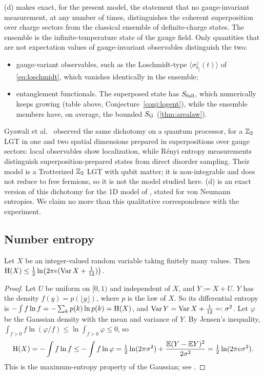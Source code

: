 \begin{remark}\label{rem:superposition-main}
(d) makes exact, for the present model, the statement that no gauge-invariant measurement,
at any number of times, distinguishes the coherent superposition over charge sectors from the classical
ensemble of definite-charge states.  The ensemble is the infinite-temperature state of the gauge field.  Only
quantities that are not expectation values of gauge-invariant observables distinguish the two:
\begin{itemize}
\item gauge-variant observables, such as the Loschmidt-type $\langle\sigma^z_{b_j}(t)\rangle$ of
\eqref{eq:loschmidt}, which vanishes identically in the ensemble;
\item entanglement functionals.  The superposed state has $S_{\mathrm{full}}$, which numerically keeps growing (table
above, Conjecture~\ref{conj:logent}), while the ensemble members have, on average, the bounded $S_{\mathrm{G}}$ (\cref{thm:arealaw}).
\end{itemize}
Gyawali et al.\ \cite{Gyawali2024} observed the same dichotomy on a quantum processor, for a $\mathbb{Z}_2$ LGT in one
and two spatial dimensions prepared in superpositions over gauge sectors: local observables show localization,
while R\'enyi entropy measurements distinguish superposition-prepared states from direct disorder sampling.
Their model is a Trotterized $\mathbb{Z}_2$ LGT with qubit matter; it is non-integrable and does not reduce to free
fermions, so it is not the model studied here.
(d) is an exact version of this dichotomy for the 1D model of \cite{SKKM2017}, stated for von
Neumann entropies.  We claim no more than this qualitative correspondence with the experiment.
\end{remark}

\subsection{Number entropy}\label{sec:main:number}

\begin{lemma}\label{lem:intentropy}
Let $X$ be an integer-valued random variable taking finitely many values.  Then
$\mathrm{H}(X)\le\frac12\ln\bigl(2\pi e(\operatorname{Var} X+\frac1{12})\bigr)$.
\end{lemma}

\begin{proof}
Let $U$ be uniform on $[0,1)$ and independent of $X$, and $Y:=X+U$.  $Y$ has the density
$f(y)=p(\lfloor y\rfloor)$, where $p$ is the law of $X$.  So its differential entropy is
$-\int f\ln f=-\sum_kp(k)\ln p(k)=\mathrm{H}(X)$, and $\operatorname{Var} Y=\operatorname{Var} X+\frac1{12}=:\sigma^2$.  Let $\varphi$ be the
Gaussian density with the mean and variance of $Y$.  By Jensen's inequality,
$\int_{f>0}f\ln(\varphi/f)\le\ln\int_{f>0}\varphi\le0$, so
\[
  \mathrm{H}(X)=-\int f\ln f\le-\int f\ln\varphi=\tfrac12\ln(2\pi\sigma^2)+\frac{\mathbb{E}(Y-\mathbb{E} Y)^2}{2\sigma^2}=\tfrac12\ln(2\pi e\sigma^2).
\]
This is the maximum-entropy property of the Gaussian; see \cite[Ch.~8]{CoverThomas2006}.
\end{proof}

